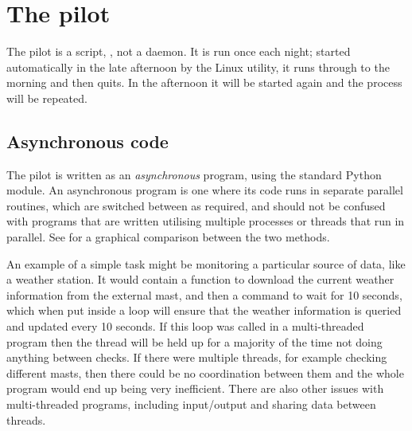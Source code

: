 \section{The pilot}
\label{sec:pilot}
\begin{colsection}


\begin{colsection}

The pilot is a  script, , not a daemon. It is run once each night; started automatically in the late afternoon by the Linux  utility, it runs through to the morning and then quits. In the afternoon it will be started again and the process will be repeated.

\end{colsection}


\subsection{Asynchronous code}
\label{sec:async}
\begin{colsection}

The pilot is written as an \textit{asynchronous} program, using the standard Python  module. An asynchronous program is one where its code runs in separate parallel routines, which are switched between as required, and should not be confused with programs that are written utilising multiple processes or threads that run in parallel. See  for a graphical comparison between the two methods.

An example of a simple task might be monitoring a particular source of data, like a weather station. It would contain a function to download the current weather information from the external mast, and then a  command to wait for 10 seconds, which when put inside a loop will ensure that the weather information is queried and updated every 10 seconds. If this loop was called in a multi-threaded program then the thread will be held up for a majority of the time not doing anything between checks. If there were multiple threads, for example checking different masts, then there could be no coordination between them and the whole program would end up being very inefficient. There are also other issues with multi-threaded programs, including input/output and sharing data between threads.


\end{colsection}
\end{colsection}
